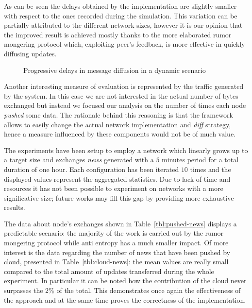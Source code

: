 As can be seen the delays obtained by the \cloudypeer implementation
are slightly smaller with respect to the ones recorded during the
simulation.
This variation can be partially attributed to
the different network sizes, however it is our opinion that the
improved result is achieved mostly thanks to the more elaborated
rumor mongering protocol which, exploiting peer's feedback, is more
effective in quickly diffusing updates.

\begin{figure}[H]
  \centering
  \caption{Progressive delays in message diffusion in a dynamic scenario}
  \label{fig:cloudcast-globa-delay}
\end{figure}

Another interesting measure of evaluation is represented by the
traffic generated by the system. In this case we are not interested
in the actual number of bytes exchanged but instead we focused our
analysis on the number of times each node \textit{pushed} some
data. The rationale behind this reasoning is that the framework allows
to easily change the actual network implementation and \textit{diff}
strategy, hence a measure influenced by these components would not be
of much value.

The experiments have been setup to employ a network
which linearly grows up to a target size and exchanges \textit{news}
generated with a $5$ minutes period for a total duration of one hour.
Each configuration has been iterated $10$ times and the displayed
values represent the aggregated statistics.
Due to lack of time and resources it has not been possible to
experiment on networks with a more significative size; future works may
fill this gap by providing more exhaustive results.

The data about node's exchanges shown in Table~\ref{tbl:pushed-news}
displays a predictable scenario: the majority of the
work is carried out by the rumor mongering protocol while anti entropy
has a much smaller impact. Of more interest is the data regarding the
number of news that have been pushed by cloud, presented in
Table~\ref{tbl:cloud-news}: the mean values are really small compared
to the total amount of updates transferred during the whole
experiment. In particular it can be noted how the contribution of the
cloud never surpasses the $2\%$ of the total. This demonstrates once
again the effectiveness of the \cloudcast approach and at the same
time proves the correctness of the implementation.

